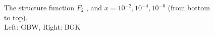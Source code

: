 \documentclass[11pt]{article}
\begin{document}
\begin{figure}[t]
\caption{The structure function $F_2$ , and $x=10^{-2}, 10^{-4}, 10^{-6}$ (from bottom to top).\\Left: GBW, Right: BGK}
\label{F2}
\end{figure}
\end{document}
